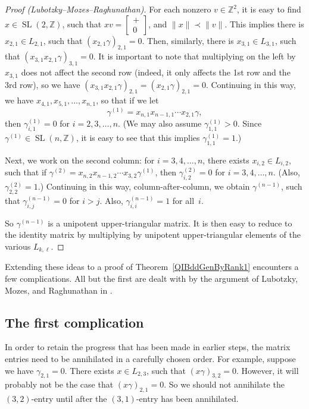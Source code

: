 \documentclass[11pt]{article}
\numberwithin{equation}{section}
\newcommand{\ZZ}{\mathbb{Z}}
\DeclareMathOperator{\SL}{SL}
\numberwithin{equation}{section}
\theoremstyle{definition}
\begin{document}
\begin{proof}[Proof \normalfont (Lubotzky--Mozes--Raghunathan)]
For each nonzero $v \in \ZZ^2$, it is easy to find $x \in \SL(2,\ZZ)$, such that $xv = \left[\begin{smallmatrix} + \\ 0 \end{smallmatrix}\right]$, and $\| x \| \prec \| v \|$.
	This implies there is $x_{2,1} \in L_{2,1}$, such that $(x_{2,1} \gamma)_{2,1} = 0$.
	Then, similarly, there is $x_{3,1} \in L_{3,1}$, such that $(x_{3,1} x_{2,1} \gamma)_{3,1} = 0$. It is important to note that multiplying on the left by $x_{3,1}$ does not affect the second row (indeed, it only affects the 1st row and the 3rd row), so we have $(x_{3,1} x_{2,1} \gamma)_{2,1} = (x_{2,1} \gamma)_{2,1} = 0$. Continuing in this way, we have $x_{4,1}, x_{5,1}, \ldots, x_{n,1}$, so that if we let
\[\gamma^{(1)} = x_{n,1} x_{n-1,1} \cdots x_{2,1} \gamma ,\]
then $\gamma^{(1)}_{i,1} = 0$ for $i = 2,3,\ldots, n$.
(We may also assume $\gamma^{(1)}_{1,1} > 0$. Since $\gamma^{(1)} \in \SL(n, \ZZ)$, it is easy to see that this implies $\gamma^{(1)}_{1,1} = 1$.)

Next, we work on the second column: for $i = 3,4, \ldots, n$, there exists $x_{i,2} \in L_{i,2}$, such that if $\gamma^{(2)} = x_{n,2} x_{n-1,2} \cdots x_{3,2} \gamma^{(1)}$, then $\gamma^{(2)}_{i,2} = 0$ for $i = 3,4,\ldots,n$. (Also, $\gamma^{(2)}_{2,2} = 1$.)
Continuing in this way, column-after-column, we obtain $\gamma^{(n-1)}$, such that $\gamma^{(n-1)}_{i,j} = 0$ for $i > j$. Also, $\gamma^{(n-1)}_{i,i} =1$ for all~$i$.

So $\gamma^{(n-1)}$ is a unipotent upper-triangular matrix. It is then easy to reduce to the identity matrix by multiplying by unipotent upper-triangular elements of the various $L_{k,\ell}$.
\end{proof}

Extending these ideas to a proof of Theorem~\ref{QIBddGenByRank1} encounters a few complications. All but the first are dealt with by the argument of Lubotzky, Mozes, and Raghunathan in \cite[Section~4]{MR1828742}.

\subsection*{The first complication}
In order to retain the progress that has been made in earlier steps, the matrix entries need to be annihilated in a carefully chosen order.
For example, suppose we have $\gamma_{2,1} = 0$. There exists $x \in L_{2,3}$, such that $(x \gamma)_{3,2} = 0$. However, it will probably not be the case that $(x \gamma)_{2,1} = 0$. So we should not annihilate the $(3,2)$-entry until after the $(3,1)$-entry has been annihilated.
\end{document}
